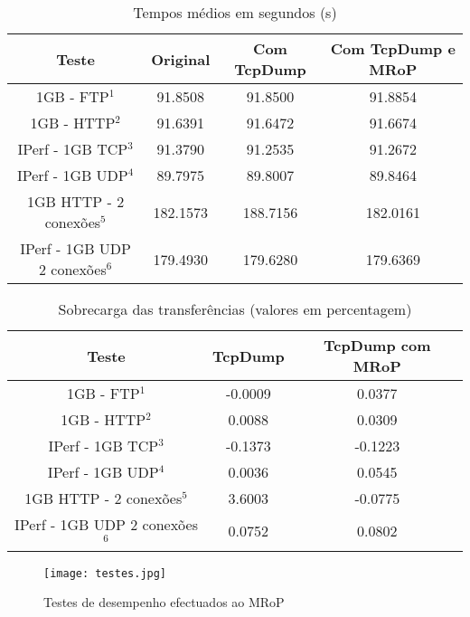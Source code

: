 \begin{table}[!htb]
\begin{center}
\caption{Tempos médios em segundos (s)}
\begin{tabular}{ | c | c | c | c |  }
\hline
Teste & \hspace {0.3cm} Original \hspace {0.3cm}& \hspace {0.2cm} Com TcpDump \hspace {0.2cm} & Com TcpDump e MRoP \\
\hline
1GB - FTP$^{1}$ & 91.8508	& 91.8500 & 91.8854 \\
1GB - HTTP$^{2}$ & 91.6391 & 91.6472 & 91.6674 \\ 
IPerf - 1GB TCP$^{3}$ & 91.3790	& 91.2535	& 91.2672 \\
IPerf - 1GB UDP$^{4}$ & 89.7975 & 89.8007 & 89.8464 \\
\hline
\hline
1GB HTTP - 2 conexões$^{5}$ & 182.1573 & 188.7156 & 182.0161 \\
IPerf - 1GB UDP 2 conexões$^{6}$ & 179.4930 & 179.6280 & 179.6369 \\
\hline
\end{tabular}
\label{tab:desempenho}
\end{center}
\end{table}

\begin{table}[!htb]
\begin{center}
\caption{Sobrecarga das transferências (valores em percentagem)}
\begin{tabular}{ | c | c | c |}
\hline
Teste & \hspace {0.3cm} TcpDump \hspace {0.3cm} & TcpDump com MRoP  \\

\hline
1GB - FTP$^{1}$ & -0.0009  & 0.0377  \\
1GB - HTTP$^{2}$ & 0.0088 &  0.0309   \\
IPerf - 1GB TCP$^{3}$ & -0.1373 &  -0.1223   \\
IPerf - 1GB UDP$^{4}$ & 0.0036 & 0.0545 \\
\hline
\hline
1GB HTTP - 2 conexões$^{5}$ & 3.6003 & -0.0775   \\
IPerf - 1GB UDP 2 conexões$^{6}$ & 0.0752 & 0.0802   \\
\hline
\end{tabular}
\label{tab:overhead}
\end{center}
\end{table}

\begin{figure}[!ht]
\centering
\texttt{[image: testes.jpg]}
\caption{Testes de desempenho efectuados ao MRoP}
\label{fig:tests_graphics}
\end{figure}

